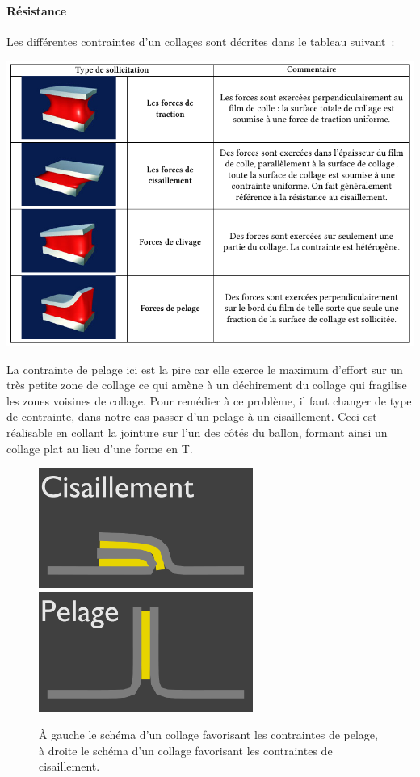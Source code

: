 \documentclass[a4paper,11pt]{article}
\begin{document}
\paragraph{Résistance}

Les différentes contraintes d'un collages sont décrites dans le tableau suivant~:
\begin{center}
 \includegraphics[width=15cm]{../Images/colle_contraintes.png}
\end{center}

La contrainte de pelage ici est la pire car elle exerce le maximum d'effort sur un très petite zone de collage ce qui amène à un déchirement du collage qui fragilise les zones voisines de collage. Pour remédier à ce problème, il faut changer de type de contrainte, dans notre cas passer d'un pelage à un cisaillement. Ceci est réalisable en collant la jointure sur l'un des côtés du ballon, formant ainsi un collage plat au lieu d'une forme en T.

\begin{figure}[H]
	\centering
 \includegraphics[width=7cm]{../Images/colle_cisaillement.png}
 \includegraphics[width=7cm]{../Images/colle_pelage.png}
 \caption{À gauche le schéma d'un collage favorisant les contraintes de pelage, à droite le schéma d'un collage favorisant les contraintes de cisaillement.}
\end{figure}
\end{document}
